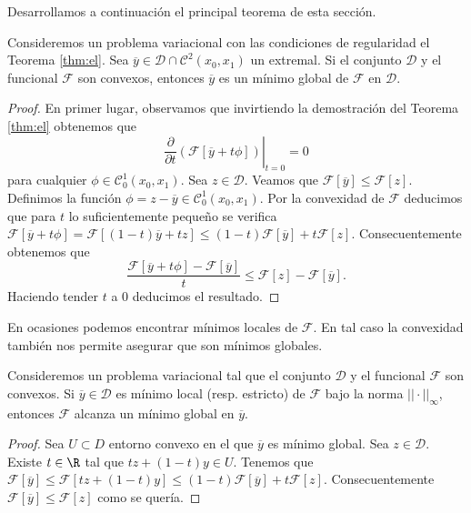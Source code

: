 \documentclass{article}
\begin{document}
Desarrollamos a continuación el principal teorema de esta sección.

\begin{theorem}
  \label{thm:convex:minimo}
  Consideremos un problema variacional con las condiciones de regularidad el Teorema
  \ref{thm:el}. Sea $\overline{y} \in \mathcal{D} \cap \mathcal{C}^2(x_0,x_1)$ un extremal. Si el
  conjunto $\mathcal{D}$ y el funcional $\mathcal{F}$ son convexos, entonces $\overline{y}$ es un
  mínimo global de $\mathcal{F}$ en $\mathcal{D}$.
\end{theorem}
\begin{proof}
  En primer lugar, observamos que invirtiendo la demostración del Teorema \ref{thm:el} obtenemos que
  \[ \left.\frac{\partial}{\partial t}\left( \mathcal{F}[ \overline{y} + t \phi ] \right)\right|_{t
      = 0} = 0 \] para cualquier $\phi \in \mathcal{C}_0^1(x_0,x_1)$. Sea $z \in
  \mathcal{D}$. Veamos que $\mathcal{F}[ \overline{y} ] \le \mathcal{F}[z]$. Definimos la función
  $\phi = z - \overline{y} \in \mathcal{C}_0^1(x_0,x_1)$. Por la convexidad de $\mathcal{F}$
  deducimos que para $t$ lo suficientemente pequeño se verifica
  $\mathcal{F}[\overline{y}+t\phi] = \mathcal{F}[(1-t)\overline{y}+ tz] \le
  (1-t)\mathcal{F}[\overline{y}] + t \mathcal{F}[z]$. Consecuentemente obtenemos que
  \[ \frac{\mathcal{F}[\overline{y}+t\phi] - \mathcal{F}[\overline{y}]}{t} \le \mathcal{F}[z] -
    \mathcal{F}[\overline{y}]. \] Haciendo tender $t$ a $0$ deducimos el resultado.
\end{proof}

En ocasiones podemos encontrar mínimos locales de $\mathcal{F}$. En tal caso la convexidad también
nos permite asegurar que son mínimos globales.

\begin{prop}
  Consideremos un problema variacional tal que el conjunto $\mathcal{D}$ y el funcional
  $\mathcal{F}$ son convexos. Si $\overline{y} \in \mathcal{D}$ es mínimo local (resp. estricto) de
  $\mathcal{F}$ bajo la norma $||\cdot||_{\infty}$, entonces $\mathcal{F}$ alcanza un mínimo global
  en $\overline{y}$.
\end{prop}
\begin{proof}
  Sea $U \subset D$ entorno convexo en el que $\overline{y}$ es mínimo global. Sea
  $z \in \mathcal{D}$. Existe $t \in \R$ tal que $tz+(1-t)y \in U$. Tenemos que
  $\mathcal{F}[ \overline{y} ] \le \mathcal{F}[tz+(1-t)y] \le (1-t)\mathcal{F}[\overline{y}] + t
  \mathcal{F}[z]$. Consecuentemente $\mathcal{F}[ \overline{y} ] \le \mathcal{F}[z]$ como se quería.
\end{proof}
\end{document}
